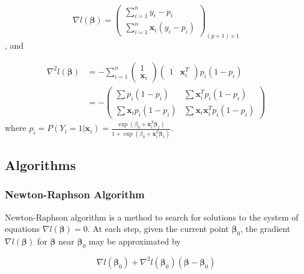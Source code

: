 \documentclass[]{article}
\begin{document}
\[
\nabla l\left(\boldsymbol{\beta}\right)=\left(\begin{array}{c}\sum_{i=1}^{n} y_{i}-p_{i} \\ \sum_{i=1}^{n} \mathbf{x}_{i}\left(y_{i}-p_{i}\right)\end{array}\right)_{(p+1) \times 1}
\] , and

\[
\begin{aligned} \nabla^{2} l\left(\boldsymbol{\beta}\right) &=-\sum_{i=1}^{n}\left(\begin{array}{c}1 \\ \mathbf{x}_{i}\end{array}\right)\left(\begin{array}{cc}1 & \mathbf{x}_{i}^{T}\end{array}\right) p_{i}\left(1-p_{i}\right) \\ &=-\left(\begin{array}{cc}\sum p_{i}\left(1-p_{i}\right) & \sum \mathbf{x}_{i}^{T} p_{i}\left(1-p_{i}\right) \\ \sum \mathbf{x}_{i} p_{i}\left(1-p_{i}\right) & \sum \mathbf{x}_{i} \mathbf{x}_{i}^{T} p_{i}\left(1-p_{i}\right)\end{array}\right) \end{aligned}
\] where
\(p_{i}=P\left(Y_{i}=1 | \mathbf{x}_{i}\right)=\frac{\exp \left(\beta_{0}+\mathbf{x}_{i}^{T} \boldsymbol{\beta}_{1}\right)}{1+\exp \left(\beta_{0}+\mathbf{x}_{i}^{T} \boldsymbol{\beta}_{1}\right)}\).

\hypertarget{algorithms}{%
\subsection{Algorithms}\label{algorithms}}

\hypertarget{newton-raphson-algorithm}{%
\subsubsection{Newton-Raphson
Algorithm}\label{newton-raphson-algorithm}}

Newton-Raphson algorithm is a method to search for solutions to the
system of equations \(\nabla l\left(\boldsymbol{\beta}\right)=0\). At
each step, given the current point \(\boldsymbol{\beta}_0\), the
gradient \(\nabla l\left(\boldsymbol{\beta}\right)\) for
\(\boldsymbol{\beta}\) near \(\boldsymbol{\beta}_0\) may be approximated
by

\[
\nabla l\left(\boldsymbol{\beta}_{0}\right)+\nabla^{2} l\left(\boldsymbol{\beta}_{0}\right)\left(\boldsymbol{\beta}-\boldsymbol{\beta}_{0}\right)
\]
\end{document}
